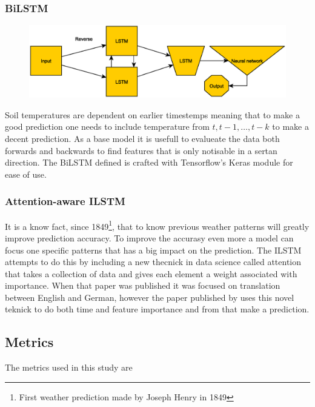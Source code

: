 \subsubsection{BiLSTM}

\begin{figure}
	\centering
	\includegraphics[width=0.7\linewidth]{figures/BiLSTM}
	\caption[BiLSTM overview]{}
	\label{fig:bilstm}
\end{figure}

Soil temperatures are dependent on earlier timestemps meaning that to make a good prediction one needs to include temperature from $t,t-1,\dots,t-k$ to make a decent prediction. As a base model it is usefull to evalueate the data both forwards and backwards to find features that is only notisable in a sertan direction. The BiLSTM defined is crafted with Tensorflow's Keras module for ease of use. 

\subsubsection{Attention-aware ILSTM}

It is a know fact, since 1849\footnote{First weather prediction made by Joseph Henry in 1849}, that to know previous weather patterns will greatly improve prediction accuracy. To improve the accurasy even more a model can focus one specific patterns that has a big impact on the prediction. The ILSTM attempts to do this by including a new thecnick in data science called attention\cite{vaswani_attention_2017} that takes a collection of data and gives each element a weight associated with importance. When that paper was published it was focused on translation between English and German, however the paper published by \citeauthor{li_attention-aware_2022} uses this novel teknick to do both time and feature importance and from that make a prediction.

\subsection{Metrics}

The metrics used in this study are

